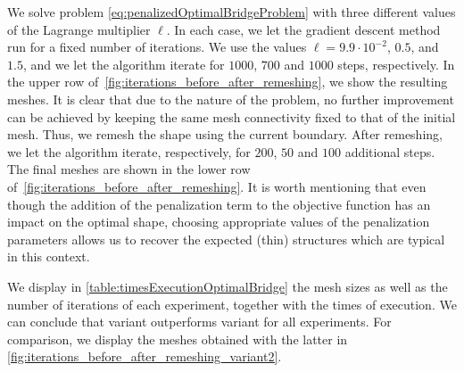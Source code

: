 We solve problem \eqref{eq:penalizedOptimalBridgeProblem} with three different values of the Lagrange multiplier $\ell$.
In each case, we let the gradient descent method run for a fixed number of iterations.
We use the values $\ell = 9.9 \cdot 10^{-2}$, $0.5$, and $1.5$, and we let the algorithm iterate for $1000$, $700$ and $1000$ steps, respectively.
In the upper row of~\cref{fig:iterations_before_after_remeshing}, we show the resulting meshes.
It is clear that due to the nature of the problem, no further improvement can be achieved by keeping the same mesh connectivity fixed to that of the initial mesh.
Thus, we remesh the shape using the current boundary.
After remeshing, we let the algorithm iterate, respectively, for $200$, $50$ and $100$ additional steps.
The final meshes are shown in the lower row of~\cref{fig:iterations_before_after_remeshing}.
It is worth mentioning that even though the addition of the penalization term to the objective function has an impact on the optimal shape, choosing appropriate values of the penalization parameters allows us to recover the expected (thin) structures which are typical in this context.

We display in \cref{table:timesExecutionOptimalBridge} the mesh sizes as well as the number of iterations of each experiment, together with the times of execution.
We can conclude that variant \CompEuc outperforms variant \ElasEuc for all experiments.
For comparison, we display the meshes obtained with the latter in \cref{fig:iterations_before_after_remeshing_variant2}.

